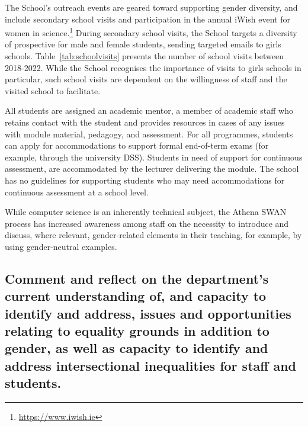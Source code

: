 The School's outreach events are geared toward supporting gender diversity, and include secondary school visits and participation in the annual iWish event for women in science.\footnote{\url{https://www.iwish.ie}} During secondary school visits, the School targets a diversity of prospective for male and female students, sending targeted emails to girls schools. 
Table~\ref{tab:schoolvisits} presents the number of school visits between 2018-2022. 
While the School recognises the importance of visits to girls schools in particular, such school visits are dependent on the willingness of staff and the visited school to facilitate. 



All students are assigned an academic mentor, a member of academic staff who retains contact with the student and provides resources in cases of any issues with module material, pedagogy, and assessment.
For all programmes, students can apply for accommodations to support formal end-of-term exams (for example, through the university \ac{DSS}). Students in need of support for continuous assessment, are accommodated by the lecturer delivering the module. 
The school has no guidelines for supporting students who may need accommodations for continuous assessment at a school level.

While computer science is an inherently technical subject, the Athena SWAN process has increased awareness among staff on the necessity to introduce and discuss, where relevant, gender-related elements in their teaching, for example, by using gender-neutral examples.

\subsection{Comment and reflect on the department’s current understanding of, and capacity to identify and address, issues and opportunities relating to equality grounds in addition to gender, as well as capacity to identify and address intersectional inequalities for staff and students.}

